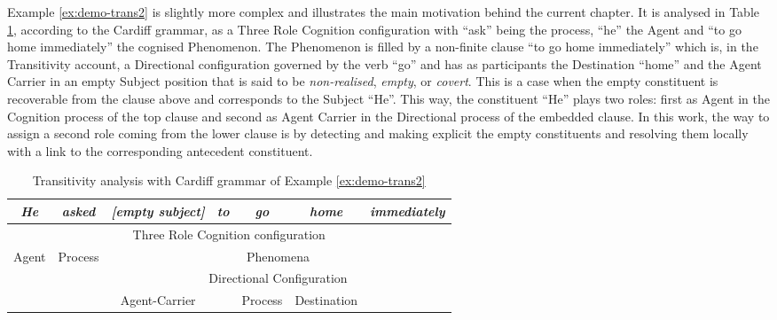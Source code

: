     Example \ref{ex:demo-trans2} is slightly more complex and illustrates the main motivation behind the current chapter. It is analysed in Table \ref{tab:demo-trans2}, according to the Cardiff grammar, as a Three Role Cognition configuration with ``ask'' being the process, ``he'' the Agent and ``to go home immediately'' the cognised Phenomenon. The Phenomenon is filled by a non-finite clause ``to go home immediately'' which is, in the Transitivity account, a Directional configuration governed by the verb ``go'' and has as participants the Destination ``home'' and the Agent Carrier in an empty Subject position that is said to be \textit{non-realised}, \textit{empty}, or \textit{covert}. This is a case when the empty constituent is recoverable from the clause above and corresponds to the Subject ``He''. This way, the constituent ``He'' plays two roles: first as Agent in the Cognition process of the top clause and second as Agent Carrier in the Directional process of the embedded clause. In this work, the way to assign a second role coming from the lower clause is by detecting and making explicit the empty constituents and resolving them locally with a link to the corresponding antecedent constituent.

    
    \begin{table}[!ht]
        \centering
        \begin{tabular}{cc|c|c|c|c|c}
            \hline
            \multicolumn{1}{|c|}{\textit{He}} & \textit{asked} & \textit{{[}empty subject{]}} & \textit{to} & \textit{go} & \textit{home} & \multicolumn{1}{c|}{\textit{immediately}} \\ \hline
            \multicolumn{7}{|c|}{Three Role Cognition configuration}                                                                                                                      \\ \hline
            \multicolumn{1}{|c|}{Agent}           & Process        & \multicolumn{5}{c|}{Phenomena}                                                                                       \\ \hline
            &                & \multicolumn{5}{c|}{Directional Configuration}                                                                       \\ \cline{3-7} 
            &                & Agent-Carrier                &             & Process     & Destination   &                                           \\ \cline{3-3} \cline{5-6}
        \end{tabular}
        \caption{Transitivity analysis with Cardiff grammar of Example \ref{ex:demo-trans2}}
        \label{tab:demo-trans2}
    \end{table}

